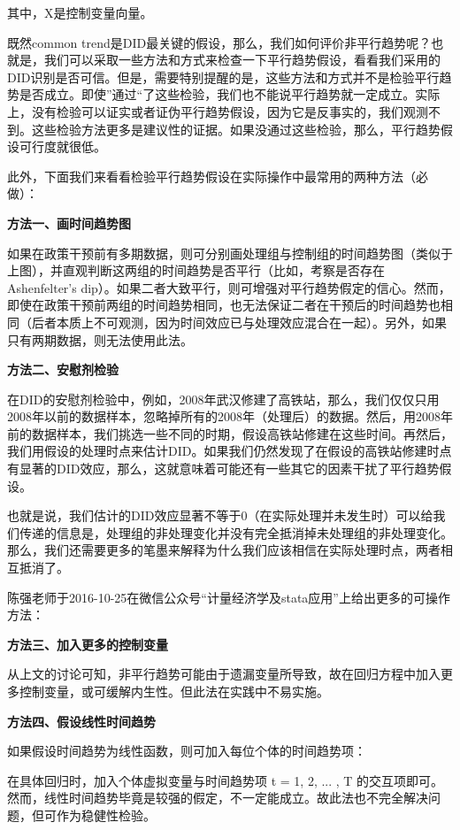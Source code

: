 \documentclass[cn,12pt,math=newtx,citestyle=gb7714-2015,bibstyle=gb7714-2015]{elegantbook}
\begin{document}
	其中，X是控制变量向量。
	
	既然common trend是DID最关键的假设，那么，我们如何评价非平行趋势呢？也就是，我们可以采取一些方法和方式来检查一下平行趋势假设，看看我们采用的DID识别是否可信。但是，需要特别提醒的是，这些方法和方式并不是检验平行趋势是否成立。即使”通过“了这些检验，我们也不能说平行趋势就一定成立。实际上，没有检验可以证实或者证伪平行趋势假设，因为它是反事实的，我们观测不到。这些检验方法更多是建议性的证据。如果没通过这些检验，那么，平行趋势假设可行度就很低。
	
	此外，下面我们来看看检验平行趋势假设在实际操作中最常用的两种方法（必做）：
	
	\textbf{方法一、画时间趋势图}
	
	如果在政策干预前有多期数据，则可分别画处理组与控制组的时间趋势图（类似于上图），并直观判断这两组的时间趋势是否平行（比如，考察是否存在Ashenfelter's dip）。如果二者大致平行，则可增强对平行趋势假定的信心。然而，即使在政策干预前两组的时间趋势相同，也无法保证二者在干预后的时间趋势也相同（后者本质上不可观测，因为时间效应已与处理效应混合在一起）。另外，如果只有两期数据，则无法使用此法。
	
	\textbf{方法二、安慰剂检验}
	
	在DID的安慰剂检验中，例如，2008年武汉修建了高铁站，那么，我们仅仅只用2008年以前的数据样本，忽略掉所有的2008年（处理后）的数据。然后，用2008年前的数据样本，我们挑选一些不同的时期，假设高铁站修建在这些时间。再然后，我们用假设的处理时点来估计DID。如果我们仍然发现了在假设的高铁站修建时点有显著的DID效应，那么，这就意味着可能还有一些其它的因素干扰了平行趋势假设。
	
	也就是说，我们估计的DID效应显著不等于0（在实际处理并未发生时）可以给我们传递的信息是，处理组的非处理变化并没有完全抵消掉未处理组的非处理变化。那么，我们还需要更多的笔墨来解释为什么我们应该相信在实际处理时点，两者相互抵消了。
	
	陈强老师于2016-10-25在微信公众号“计量经济学及stata应用”上给出更多的可操作方法：
	
	\textbf{方法三、加入更多的控制变量}
	
	从上文的讨论可知，非平行趋势可能由于遗漏变量所导致，故在回归方程中加入更多控制变量，或可缓解内生性。但此法在实践中不易实施。
	
	\textbf{方法四、假设线性时间趋势}
	
	如果假设时间趋势为线性函数，则可加入每位个体的时间趋势项：
	
	在具体回归时，加入个体虚拟变量与时间趋势项 t = 1, 2, ... , T 的交互项即可。然而，线性时间趋势毕竟是较强的假定，不一定能成立。故此法也不完全解决问题，但可作为稳健性检验。
	
\end{document}
